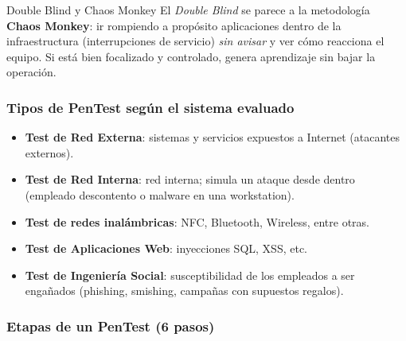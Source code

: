 \documentclass[11pt,a4paper]{article}
\begin{document}
\begin{anecbox}{Double Blind y Chaos Monkey}
El \emph{Double Blind} se parece a la metodología \textbf{Chaos Monkey}: ir rompiendo a propósito
aplicaciones dentro de la infraestructura (interrupciones de servicio) \emph{sin avisar} y ver
cómo reacciona el equipo. Si está bien focalizado y controlado, genera aprendizaje sin bajar la
operación.
\end{anecbox}

\subsubsection{Tipos de PenTest según el sistema evaluado}
\begin{itemize}[leftmargin=1.4em,itemsep=1pt]
  \item \textbf{Test de Red Externa}: sistemas y servicios expuestos a Internet (atacantes
        externos).
  \item \textbf{Test de Red Interna}: red interna; simula un ataque desde dentro (empleado
        descontento o malware en una workstation).
  \item \textbf{Test de redes inalámbricas}: NFC, Bluetooth, Wireless, entre otras.
  \item \textbf{Test de Aplicaciones Web}: inyecciones SQL, XSS, etc.
  \item \textbf{Test de Ingeniería Social}: susceptibilidad de los empleados a ser engañados
        (phishing, smishing, campañas con supuestos regalos).
\end{itemize}

\subsubsection{Etapas de un PenTest (6 pasos)}

\begin{center}
\end{center}
\end{document}
